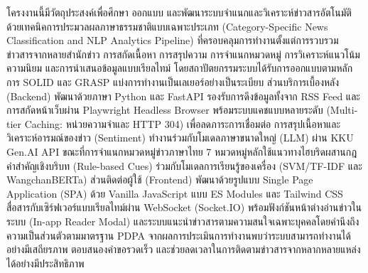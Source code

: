 โครงงานนี้มีวัตถุประสงค์เพื่อศึกษา ออกแบบ และพัฒนาระบบจำแนกและวิเคราะห์ข่าวสารอัตโนมัติด้วยเทคนิคการประมวลผลภาษาธรรมชาติแบบเฉพาะประเภท (Category-Specific News Classification and NLP Analytics Pipeline) ที่ครอบคลุมการทำงานตั้งแต่การรวบรวมข่าวสารจากหลายสำนักข่าว การสกัดเนื้อหา การสรุปความ การจำแนกหมวดหมู่ การวิเคราะห์แนวโน้มความนิยม และการนำเสนอข้อมูลแบบเรียลไทม์ โดยสถาปัตยกรรมระบบได้รับการออกแบบตามหลักการ SOLID และ GRASP แบ่งการทำงานเป็นเลเยอร์อย่างเป็นระเบียบ ส่วนบริการเบื้องหลัง (Backend) พัฒนาด้วยภาษา Python และ FastAPI รองรับการดึงข้อมูลทั้งจาก RSS Feed และการสกัดหน้าเว็บผ่าน Playwright Headless Browser พร้อมระบบแคชแบบหลายระดับ (Multi-tier Caching: หน่วยความจำและ HTTP 304) เพื่อลดภาระการเชื่อมต่อ การสรุปเนื้อหาและวิเคราะห์อารมณ์ของข่าว (Sentiment) ทำงานร่วมกับโมเดลภาษาขนาดใหญ่ (LLM) ผ่าน KKU Gen.AI API ขณะที่การจำแนกหมวดหมู่ข่าวภาษาไทย 7 หมวดหมู่หลักใช้แนวทางไฮบริดผสานกฎคำสำคัญเชิงบริบท (Rule-based Cues) ร่วมกับโมเดลการเรียนรู้ของเครื่อง (SVM/TF-IDF และ WangchanBERTa) ส่วนติดต่อผู้ใช้ (Frontend) พัฒนาด้วยรูปแบบ Single Page Application (SPA) ด้วย Vanilla JavaScript แบบ ES Modules และ Tailwind CSS สื่อสารกับเซิร์ฟเวอร์แบบเรียลไทม์ผ่าน WebSocket (Socket.IO) พร้อมฟังก์ชันหน้าต่างอ่านข่าวในระบบ (In-app Reader Modal) และระบบแนะนำข่าวสารตามความสนใจเฉพาะบุคคลโดยคำนึงถึงความเป็นส่วนตัวตามมาตรฐาน PDPA จากผลการประเมินการทำงานพบว่าระบบสามารถทำงานได้อย่างมีเสถียรภาพ ตอบสนองคำขอรวดเร็ว และช่วยลดเวลาในการติดตามข่าวสารจากหลากหลายแหล่งได้อย่างมีประสิทธิภาพ